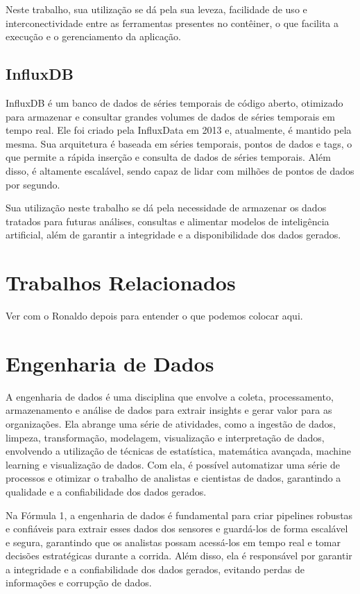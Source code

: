 \documentclass[12pt, %
openright, 
oneside, %
a4paper,    %
brazil]{facom-ufu-abntex2}
\begin{document}
Neste trabalho, sua utilização se dá pela sua leveza, facilidade de uso e interconectividade entre as ferramentas presentes no contêiner, o que facilita a execução e o gerenciamento da aplicação.

\subsection{InfluxDB}
InfluxDB é um banco de dados de séries temporais de código aberto, otimizado para armazenar e consultar grandes volumes de dados de séries temporais em tempo real. Ele foi criado pela InfluxData em 2013 e, atualmente, é mantido pela mesma.
Sua arquitetura é baseada em séries temporais, pontos de dados e tags, o que permite a rápida inserção e consulta de dados de séries temporais. Além disso, é altamente escalável, sendo capaz de lidar com milhões de pontos de dados por segundo.

Sua utilização neste trabalho se dá pela necessidade de armazenar os dados tratados para futuras análises, consultas e alimentar modelos de inteligência artificial, 
além de garantir a integridade e a disponibilidade dos dados gerados. 

\section{Trabalhos Relacionados}

Ver com o Ronaldo depois para entender o que podemos colocar aqui.

\section{Engenharia de Dados}
A engenharia de dados é uma disciplina que envolve a coleta, processamento, armazenamento e análise de dados para extrair insights e gerar valor para as organizações. Ela abrange uma série de atividades, como a ingestão de dados, limpeza, transformação, modelagem, visualização 
e interpretação de dados, envolvendo a utilização de técnicas de estatística, matemática avançada, machine learning e visualização de dados. Com ela, é possível automatizar uma série de processos e otimizar o trabalho de analistas
e cientistas de dados, garantindo a qualidade e a confiabilidade dos dados gerados.

Na Fórmula 1, a engenharia de dados é fundamental para criar pipelines robustas e confiáveis para extrair esses dados dos sensores e guardá-los de forma
escalável e segura, garantindo que os analistas possam acessá-los em tempo real e tomar decisões estratégicas durante a corrida. Além disso, ela é responsável por
garantir a integridade e a confiabilidade dos dados gerados, evitando perdas de informações e corrupção de dados.
\end{document}
